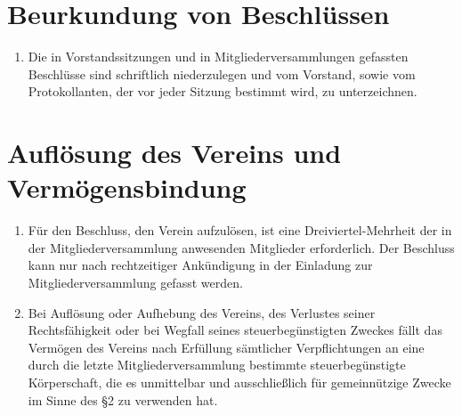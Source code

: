 \documentclass[a4paper,12pt]{scrartcl}
\begin{document}
\section{Beurkundung von Beschlüssen}
\begin{enumerate}
  \item Die in Vorstandssitzungen und in Mitgliederversammlungen gefassten
    Beschlüsse sind schriftlich niederzulegen und vom Vorstand, sowie vom
    Protokollanten, der vor jeder Sitzung bestimmt wird, zu unterzeichnen.
\end{enumerate}

\section{Auflösung des Vereins und Vermögensbindung}
\begin{enumerate}
  \item Für den Beschluss, den Verein aufzulösen, ist eine Dreiviertel-Mehrheit
    der in der Mitgliederversammlung anwesenden Mitglieder erforderlich. Der
    Beschluss kann nur nach rechtzeitiger Ankündigung in der Einladung zur
    Mitgliederversammlung gefasst werden.
  \item Bei Auflösung oder Aufhebung des Vereins, des Verlustes seiner
    Rechtsfähigkeit oder bei Wegfall seines steuerbegünstigten Zweckes fällt
    das Vermögen des Vereins nach Erfüllung sämtlicher Verpflichtungen an
    eine durch die letzte Mitgliederversammlung bestimmte steuerbegünstigte
    Körperschaft, die es unmittelbar und ausschließlich für gemeinnützige
    Zwecke im Sinne des §2 zu verwenden hat.
\end{enumerate}
\end{document}
